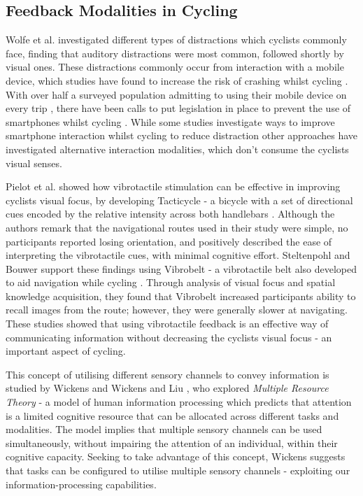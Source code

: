 \documentclass{mpaper}
\begin{document}
\subsection{Feedback Modalities in Cycling}
Wolfe et al. \cite{wolfe2016distracted} investigated different types of distractions which cyclists commonly face, finding that auditory distractions were most common, followed shortly by visual ones. These distractions commonly occur from interaction with a mobile device, which studies have found to increase the risk of crashing whilst cycling \cite{mwakalonge2014distracted, doi:10.1080/19439962.2019.1591559}. With over half a surveyed population admitting to using their mobile device on every trip \cite{GOLDENBELD20121}, there have been calls to put legislation in place to prevent the use of smartphones whilst cycling \cite{banphoneuse}. While some studies investigate ways to improve smartphone interaction whilst cycling to reduce distraction \cite{10.1145/3544548.3580971, 10.1145/3152832.3152871} other approaches have investigated alternative interaction modalities, which don’t consume the cyclists visual senses.

Pielot et al. showed how vibrotactile stimulation can be effective in improving cyclists visual focus, by developing Tacticycle - a bicycle with a set of directional cues encoded by the relative intensity across both handlebars \cite{10.1145/2371574.2371631}. Although the authors remark that the navigational routes used in their study were simple, no participants reported losing orientation, and positively described the ease of interpreting the vibrotactile cues, with minimal cognitive effort. Steltenpohl and Bouwer support these findings using Vibrobelt - a vibrotactile belt also developed to aid navigation while cycling \cite{10.1145/2449396.2449450}. Through analysis of visual focus and spatial knowledge acquisition, they found that Vibrobelt increased participants ability to recall images from the route; however, they were generally slower at navigating. These studies showed that using vibrotactile feedback is an effective way of communicating information without decreasing the cyclists visual focus - an important aspect of cycling.

This concept of utilising different sensory channels to convey information is studied by Wickens \cite{wickens1984processing} and Wickens and Liu \cite{doi:10.1177/001872088803000505}, who explored \textit{Multiple Resource Theory} - a model of human information processing which predicts that attention is a limited cognitive resource that can be allocated across different tasks and modalities. The model implies that multiple sensory channels can be used simultaneously, without impairing the attention of an individual, within their cognitive capacity. Seeking to take advantage of this concept, Wickens suggests that tasks can be configured to utilise multiple sensory channels - exploiting our information-processing capabilities.
\end{document}
